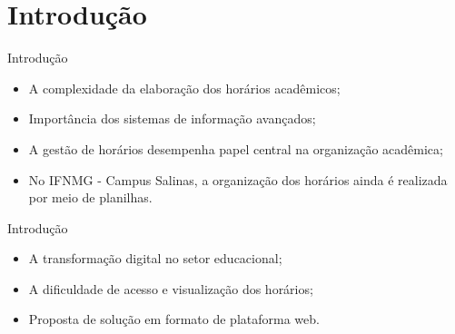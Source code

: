 \section{Introdução}

\begin{frame}{Introdução}
	\begin{itemize}
		\item A complexidade da elaboração dos horários acadêmicos; \vspace{0.5cm}
		\item Importância dos sistemas de informação avançados; \vspace{0.5cm}
		\item A gestão de horários desempenha papel central na organização acadêmica; \vspace{0.5cm}
		\item No IFNMG - Campus Salinas, a organização dos horários ainda é realizada por meio de planilhas. \vspace{0.5cm}
	\end{itemize}
\end{frame}

\begin{frame}{Introdução}
	\begin{itemize}
		\item A transformação digital no setor educacional; \vspace{0.5cm}
		\item A dificuldade de acesso e visualização dos horários; \vspace{0.5cm}
		\item Proposta de solução em formato de plataforma web. \vspace{0.5cm}
	\end{itemize}
\end{frame}